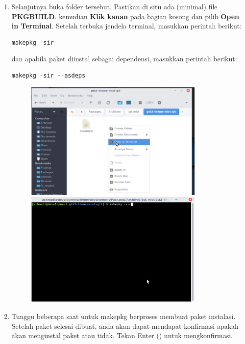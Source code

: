\documentclass[12pt,]{article}
\begin{document}
\begin{enumerate}
		\item Selanjutnya buka folder tersebut.
		Pastikan di situ ada (minimal) file \textbf{PKGBUILD}.
		kemudian \textbf{Klik kanan} pada bagian kosong dan pilih \textbf{Open in Terminal}.
		Setelah terbuka jendela terminal, masukkan perintah berikut:
		
		\begin{verbatim}
makepkg -sir
		\end{verbatim} 
		
		dan apabila paket diinstal sebagai dependensi, masukkan perintah berikut:
		
		\begin{verbatim}
makepkg -sir --asdeps
		\end{verbatim}
		
		\begin{figure}[!ht]
			\centering
			\includegraphics[width=250pt]{aur/terminal}
			\includegraphics[width=250pt]{aur/makepkg}
		\end{figure} 
		
		\item Tunggu beberapa saat untuk makepkg berproses membuat paket instalasi.
		Setelah paket selesai dibuat, anda akan dapat mendapat konfirmasi apakah akan menginstal paket atau tidak.
		Tekan Enter (\keys{\return}) untuk mengkonfirmasi.	
		

\end{enumerate}
\end{document}
